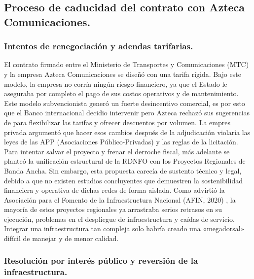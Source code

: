 \subsection{Proceso de caducidad del contrato con Azteca Comunicaciones.}
\subsubsection{Intentos de renegociación y adendas tarifarias.}

El contrato firmado entre el Ministerio de Transportes y Comunicaciones (MTC) y la empresa Azteca 
Comunicaciones se diseñó con una tarifa rígida. Bajo este modelo, la empresa no corría ningún riesgo 
financiero, ya que el Estado le aseguraba por completo el pago de sus costos operativos y de mantenimiento.\\
Este modelo subvencionista generó un fuerte desincentivo comercial, es por esto que el Banco internacional
decidio intervenir pero Azteca rechazó sus sugerencias de para flexibilizar las tarifas y ofrecer descuentos 
por volumen. La empres privada argumentó que hacer 
esos cambios después de la adjudicación violaría las leyes de las APP (Asociaciones Público-Privadas) y las 
reglas de la licitación.\\

Para intentar salvar el proyecto y frenar el derroche fiscal, más adelante se planteó la unificación estructural de 
la RDNFO con los Proyectos Regionales de Banda Ancha. Sin embargo, 
esta propuesta carecía de sustento técnico y legal, debido a que no existen estudios concluyentes que 
demuestren la sostenibilidad financiera y operativa de dichas redes de forma aislada. Como advirtió la 
Asociación para el Fomento de la Infraestructura Nacional (AFIN, 2020)
, la mayoría de estos proyectos regionales ya arrastraba serios retrasos en su ejecución, problemas en el 
despliegue de infraestructura 
y caídas de servicio. Integrar una infraestructura tan compleja solo habría creado una «megadorsal» 
difícil de manejar y de menor calidad.

\subsubsection{Resolución por interés público y reversión de la infraestructura.}

